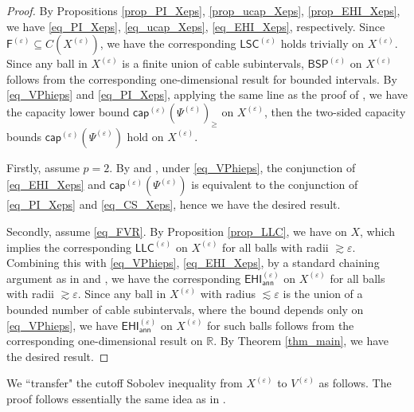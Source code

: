 \documentclass[11pt,a4paper]{article}
\numberwithin{equation}{section}
\theoremstyle{plain}
\theoremstyle{definition}
\begin{document}
\begin{proof}
By Propositions \ref{prop_PI_Xeps}, \ref{prop_ucap_Xeps}, \ref{prop_EHI_Xeps}, we have \ref{eq_PI_Xeps}, \ref{eq_ucap_Xeps}, \ref{eq_EHI_Xeps}, respectively. Since $\mathsf{F}^{(\varepsilon)}\subseteq C(X^{(\varepsilon)})$, we have the corresponding \hyperlink{eq_LSC}{$\mathsf{LSC}^{(\varepsilon)}$} holds trivially on $X^{(\varepsilon)}$. Since any ball in $X^{(\varepsilon)}$ is a finite union of cable subintervals, \hyperref[eq_BSP]{$\mathsf{BSP}^{(\varepsilon)}$} on $X^{(\varepsilon)}$ follows from the corresponding one-dimensional result for bounded intervals. By \ref{eq_VPhieps} and \ref{eq_PI_Xeps}, applying the same line as the proof of \cite[Lemma 5.1 (a)]{BB04}, we have the capacity lower bound \hyperref[eq_lcap]{$\mathsf{cap}^{(\varepsilon)}(\Psi^{(\varepsilon)})_\ge$} on $X^{(\varepsilon)}$, then the two-sided capacity bounds \hyperlink{eq_cap}{$\mathsf{cap}^{(\varepsilon)}(\Psi^{(\varepsilon)})$} hold on $X^{(\varepsilon)}$.

Firstly, assume $p=2$. By \cite[Theorem 3.14]{GH14} and \cite[THEOREM 1.2]{GHL15}, under \ref{eq_VPhieps}, the conjunction of \ref{eq_EHI_Xeps} and \hyperlink{eq_cap}{$\mathsf{cap}^{(\varepsilon)}(\Psi^{(\varepsilon)})$} is equivalent to the conjunction of \ref{eq_PI_Xeps} and \ref{eq_CS_Xeps}, hence we have the desired result.

Secondly, assume \ref{eq_FVR}. By Proposition \ref{prop_LLC}, we have \hyperlink{eq_LLC}{} on $X$, which implies the corresponding \hyperlink{eq_LLC}{$\mathsf{LLC}^{(\varepsilon)}$} on $X^{(\varepsilon)}$ for all balls with radii $\gtrsim\varepsilon$. Combining this with \ref{eq_VPhieps}, \ref{eq_EHI_Xeps}, by a standard chaining argument as in \cite[Theorem 3.1]{Bla01} and \cite[LEMMA 6.3]{GS05}, we have the corresponding \hyperref[eq_EHIann]{$\mathsf{EHI}_{\mathsf{ann}}^{(\varepsilon)}$} on $X^{(\varepsilon)}$ for all balls with radii $\gtrsim\varepsilon$. Since any ball in $X^{(\varepsilon)}$ with radius $\lesssim\varepsilon$ is the union of a bounded number of cable subintervals, where the bound depends only on \ref{eq_VPhieps}, we have \hyperref[eq_EHIann]{$\mathsf{EHI}_{\mathsf{ann}}^{(\varepsilon)}$} on $X^{(\varepsilon)}$ for such balls follows from the corresponding one-dimensional result on $\mathbb{R}$. By Theorem \ref{thm_main}, we have the desired result.
\end{proof}

We ``transfer" the cutoff Sobolev inequality from $X^{(\varepsilon)}$ to $V^{(\varepsilon)}$ as follows. The proof follows essentially the same idea as in \cite[Proposition 3.4]{BB04}.
\end{document}
